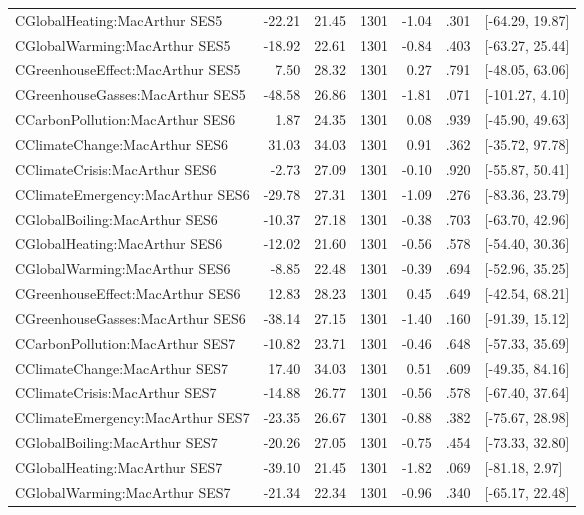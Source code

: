 \begin{table}[ht]
\begin{tabular}{lrrrrrl}
  CGlobalHeating:MacArthur SES5 & -22.21 & 21.45 & 1301 & -1.04 & .301 & [-64.29, 19.87] \\ 
  CGlobalWarming:MacArthur SES5 & -18.92 & 22.61 & 1301 & -0.84 & .403 & [-63.27, 25.44] \\ 
  CGreenhouseEffect:MacArthur SES5 & 7.50 & 28.32 & 1301 & 0.27 & .791 & [-48.05, 63.06] \\ 
  CGreenhouseGasses:MacArthur SES5 & -48.58 & 26.86 & 1301 & -1.81 & .071 & [-101.27, 4.10] \\ 
  CCarbonPollution:MacArthur SES6 & 1.87 & 24.35 & 1301 & 0.08 & .939 & [-45.90, 49.63] \\ 
  CClimateChange:MacArthur SES6 & 31.03 & 34.03 & 1301 & 0.91 & .362 & [-35.72, 97.78] \\ 
  CClimateCrisis:MacArthur SES6 & -2.73 & 27.09 & 1301 & -0.10 & .920 & [-55.87, 50.41] \\ 
  CClimateEmergency:MacArthur SES6 & -29.78 & 27.31 & 1301 & -1.09 & .276 & [-83.36, 23.79] \\ 
  CGlobalBoiling:MacArthur SES6 & -10.37 & 27.18 & 1301 & -0.38 & .703 & [-63.70, 42.96] \\ 
  CGlobalHeating:MacArthur SES6 & -12.02 & 21.60 & 1301 & -0.56 & .578 & [-54.40, 30.36] \\ 
  CGlobalWarming:MacArthur SES6 & -8.85 & 22.48 & 1301 & -0.39 & .694 & [-52.96, 35.25] \\ 
  CGreenhouseEffect:MacArthur SES6 & 12.83 & 28.23 & 1301 & 0.45 & .649 & [-42.54, 68.21] \\ 
  CGreenhouseGasses:MacArthur SES6 & -38.14 & 27.15 & 1301 & -1.40 & .160 & [-91.39, 15.12] \\ 
  CCarbonPollution:MacArthur SES7 & -10.82 & 23.71 & 1301 & -0.46 & .648 & [-57.33, 35.69] \\ 
  CClimateChange:MacArthur SES7 & 17.40 & 34.03 & 1301 & 0.51 & .609 & [-49.35, 84.16] \\ 
  CClimateCrisis:MacArthur SES7 & -14.88 & 26.77 & 1301 & -0.56 & .578 & [-67.40, 37.64] \\ 
  CClimateEmergency:MacArthur SES7 & -23.35 & 26.67 & 1301 & -0.88 & .382 & [-75.67, 28.98] \\ 
  CGlobalBoiling:MacArthur SES7 & -20.26 & 27.05 & 1301 & -0.75 & .454 & [-73.33, 32.80] \\ 
  CGlobalHeating:MacArthur SES7 & -39.10 & 21.45 & 1301 & -1.82 & .069 & [-81.18, 2.97] \\ 
  CGlobalWarming:MacArthur SES7 & -21.34 & 22.34 & 1301 & -0.96 & .340 & [-65.17, 22.48] \\ 

\end{tabular}
\end{table}
